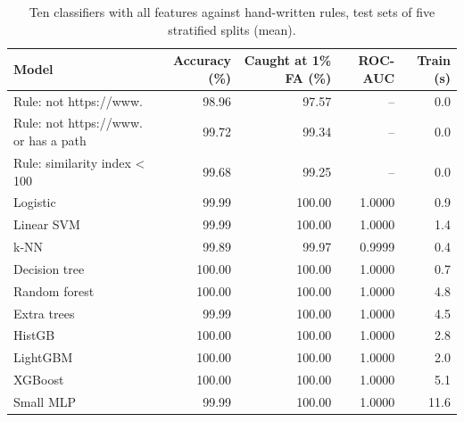 \begin{table}[t]
\centering
\caption{Ten classifiers with all features against hand-written rules, test sets of five stratified splits (mean).}
\label{tab:main}
\begin{tabular}{lrrrr}
\toprule
Model & Accuracy (\%) & Caught at 1\% FA (\%) & ROC-AUC & Train (s) \\
\midrule
Rule: not https://www. & 98.96 & 97.57 & -- & 0.0 \\
Rule: not https://www. or has a path & 99.72 & 99.34 & -- & 0.0 \\
Rule: similarity index < 100 & 99.68 & 99.25 & -- & 0.0 \\
Logistic & 99.99 & 100.00 & 1.0000 & 0.9 \\
Linear SVM & 99.99 & 100.00 & 1.0000 & 1.4 \\
k-NN & 99.89 & 99.97 & 0.9999 & 0.4 \\
Decision tree & 100.00 & 100.00 & 1.0000 & 0.7 \\
Random forest & 100.00 & 100.00 & 1.0000 & 4.8 \\
Extra trees & 99.99 & 100.00 & 1.0000 & 4.5 \\
HistGB & 100.00 & 100.00 & 1.0000 & 2.8 \\
LightGBM & 100.00 & 100.00 & 1.0000 & 2.0 \\
XGBoost & 100.00 & 100.00 & 1.0000 & 5.1 \\
Small MLP & 99.99 & 100.00 & 1.0000 & 11.6 \\
\bottomrule
\end{tabular}
\end{table}